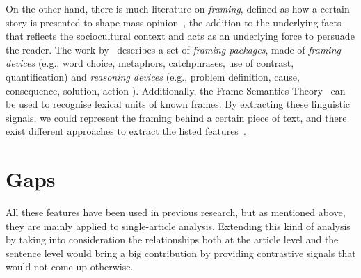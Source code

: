 On the other hand, there is much literature on \emph{framing}, defined
as how a certain story is presented to shape mass opinion~\cite{goffman1974frame}, the addition to the underlying facts that reflects the sociocultural context
and acts as an underlying force to persuade the reader.
The work by~\cite{gamson1989media} describes a set of \emph{framing packages}, made of \emph{framing devices} (e.g., word choice, metaphors, catchphrases, 
use of contrast, quantification) and \emph{reasoning devices} (e.g., problem definition, cause, consequence, solution, action%
).
Additionally, the Frame Semantics Theory~\cite{fillmore2006frame} can be used to recognise lexical units of known frames.
By extracting these linguistic signals, we could represent the framing behind a certain piece of text, and there exist different approaches to extract the listed features~\cite{mandal2017overview,gao2018neural,asghar2016automatic,swayamdipta:17}.


\section{Gaps}

All these features have been used in previous research, but as mentioned above, they are mainly applied to single-article analysis. Extending this kind of analysis by taking into consideration the relationships both at the article level and the sentence level would bring a big contribution by providing contrastive signals that would not come up otherwise. 

% 